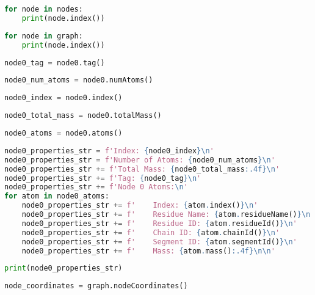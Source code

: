 \documentclass{article}
\begin{document}
    \begin{lstlisting}[language=Python]
for node in nodes:
    print(node.index())
    \end{lstlisting}

    \begin{lstlisting}[language=Python]
for node in graph:
    print(node.index())
    \end{lstlisting}

    \begin{lstlisting}[language=Python]
node0_tag = node0.tag()
    \end{lstlisting}

    \begin{lstlisting}[language=Python]
node0_num_atoms = node0.numAtoms()
    \end{lstlisting}

    \begin{lstlisting}[language=Python]
node0_index = node0.index()
    \end{lstlisting}

    \begin{lstlisting}[language=Python]
node0_total_mass = node0.totalMass()
    \end{lstlisting}

    \begin{lstlisting}[language=Python]
node0_atoms = node0.atoms()
    \end{lstlisting}

    \begin{lstlisting}[language=Python]
node0_properties_str = f'Index: {node0_index}\n'
node0_properties_str = f'Number of Atoms: {node0_num_atoms}\n'
node0_properties_str += f'Total Mass: {node0_total_mass:.4f}\n'
node0_properties_str += f'Tag: {node0_tag}\n'
node0_properties_str += f'Node 0 Atoms:\n'
for atom in node0_atoms:
    node0_properties_str += f'    Index: {atom.index()}\n'
    node0_properties_str += f'    Residue Name: {atom.residueName()}\n'
    node0_properties_str += f'    Residue ID: {atom.residueId()}\n'
    node0_properties_str += f'    Chain ID: {atom.chainId()}\n'
    node0_properties_str += f'    Segment ID: {atom.segmentId()}\n'
    node0_properties_str += f'    Mass: {atom.mass():.4f}\n\n'
    \end{lstlisting}

    \begin{lstlisting}[language=Python]
print(node0_properties_str)
    \end{lstlisting}

    \begin{lstlisting}[language=Python]
node_coordinates = graph.nodeCoordinates()
    \end{lstlisting}
\end{document}

